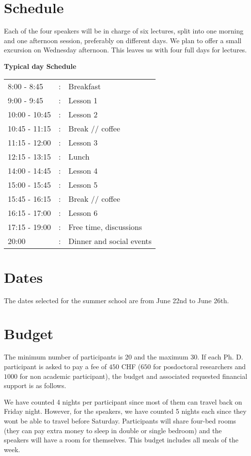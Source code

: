 \documentclass[a4paper]{scrartcl}
\begin{document}
\section{Schedule}
Each of the four speakers will be in charge of six lectures, split into one morning and one afternoon session, preferably on different days. We plan to offer a small excursion on Wednesday afternoon. This leaves us with four full days for lectures.

\vspace{0.5cm}
{{\bf{Typical day Schedule}}\\
\begin{tabular}{lll}
8:00 - 8:45 &:& Breakfast \\
9:00 - 9:45 &:& Lesson 1 \\
10:00 - 10:45 &:&  Lesson 2 \\
10:45 - 11:15 &:&  Break // coffee \\
11:15 - 12:00 &:&  Lesson 3 \\
12:15 - 13:15 &:&  Lunch \\
14:00 - 14:45 &:&  Lesson 4 \\
15:00 - 15:45 &:&  Lesson 5 \\
15:45 - 16:15 &:&  Break // coffee \\
16:15 - 17:00 &:&  Lesson 6 \\
17:15 - 19:00 &:&  Free time, discussions \\
20:00 &:&  Dinner and social events
\end{tabular}

\section{Dates}
The dates selected for the summer school are from June 22nd to June 26th. 


\section{Budget}
The minimum number of participants is 20 and the maximum 30. If each Ph. D. participant is asked to pay a fee of $450$ CHF ($650$ for posdoctoral researchers and $1000$ for non academic participant), the budget and associated requested financial support is as follows.

We have counted 4 nights per participant since most of them can travel back on Friday night. However, for the speakers, we have counted 5 nights each since they wont be able to travel before Saturday. Participants will share four-bed rooms (they can pay extra money to sleep in double or single bedroom) and the speakers will have a room for themselves. This budget includes all meals of the week.

}
\end{document}
